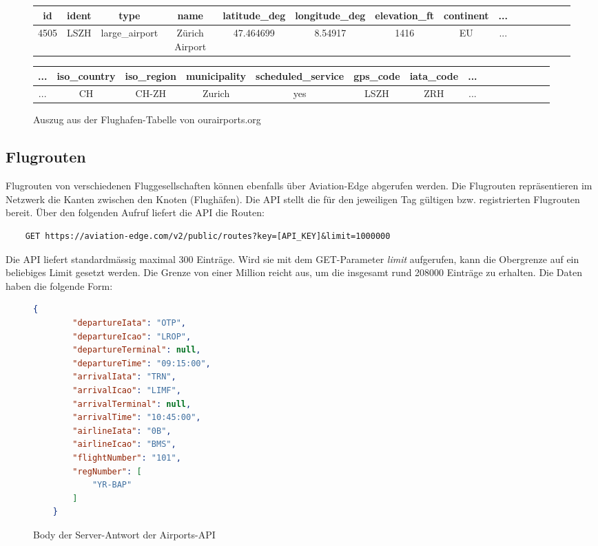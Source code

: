 \begin{figure}[ht]
\centering
\label{fig:tableAirportsCSV}
\scriptsize{%
    \begin{tabular}[ht]{c|c|c|c|c|c|c|c|c|c|c|c|c|c|c}
        id & ident & type &	name & latitude\_deg & longitude\_deg & elevation\_ft & continent & ... \\
        \hline
        4505 & LSZH & large\_airport & Zürich Airport & 47.464699 & 8.54917 & 1416 & EU & ...\\
    \end{tabular}

    \newline
    \newline
    \begin{tabular}[ht]{c|c|c|c|c|c|c|c|c|c|c|c|c|c|c}
        ... & iso\_country & iso\_region & municipality & scheduled\_service & gps\_code & iata\_code & ... \\
        \hline
        ... & CH & CH-ZH & Zurich & yes & LSZH & ZRH & ... \\
    \end{tabular}
}
\caption{Auszug aus der Flughafen-Tabelle von ourairports.org}
\end{figure}


\subsection{Flugrouten}
\label{sec:routes}

Flugrouten von verschiedenen Fluggesellschaften können ebenfalls über Aviation-Edge abgerufen werden.
Die Flugrouten repräsentieren im Netzwerk die Kanten zwischen den Knoten (Flughäfen).
Die API stellt die für den jeweiligen Tag gültigen bzw. registrierten Flugrouten bereit.
Über den folgenden Aufruf liefert die API die Routen:

\begin{lstlisting}
    GET https://aviation-edge.com/v2/public/routes?key=[API_KEY]&limit=1000000
\end{lstlisting}

Die API liefert standardmässig maximal 300 Einträge. Wird sie mit dem GET-Parameter \textit{limit} aufgerufen, kann
die Obergrenze auf ein beliebiges Limit gesetzt werden.
Die Grenze von einer Million reicht aus, um die insgesamt rund 208000 Einträge zu erhalten.
Die Daten haben die folgende Form:

\begin{figure}[ht]
    \centering
    \begin{lstlisting}[language=json]
    {
        "departureIata": "OTP",
        "departureIcao": "LROP",
        "departureTerminal": null,
        "departureTime": "09:15:00",
        "arrivalIata": "TRN",
        "arrivalIcao": "LIMF",
        "arrivalTerminal": null,
        "arrivalTime": "10:45:00",
        "airlineIata": "0B",
        "airlineIcao": "BMS",
        "flightNumber": "101",
        "regNumber": [
            "YR-BAP"
        ]
    }
    \end{lstlisting}
    \caption{Body der Server-Antwort der Airports-API}
    \label{lst:routesAPIResponse}
\end{figure}


